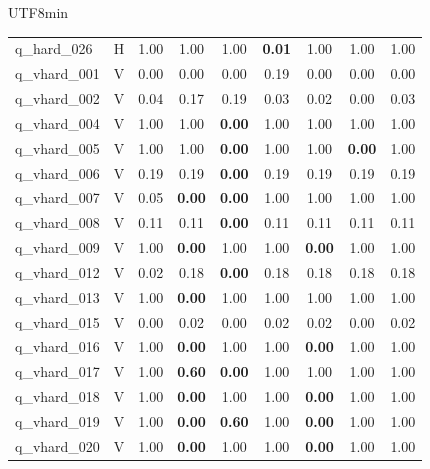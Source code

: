\documentclass[sn-mathphys,Numbered]{sn-jnl}
\begin{document}
\begin{CJK}{UTF8}{min}
\begin{table}[htbp]
\begin{tabular}{@{}llccccccc@{}}
    q\_hard\_026 & H & 1.00 & 1.00 & 1.00 & \textbf{0.01} & 1.00 & 1.00 & 1.00 \\
    q\_vhard\_001 & V & 0.00 & 0.00 & 0.00 & 0.19 & 0.00 & 0.00 & 0.00 \\
    q\_vhard\_002 & V & 0.04 & 0.17 & 0.19 & 0.03 & 0.02 & 0.00 & 0.03 \\
    q\_vhard\_004 & V & 1.00 & 1.00 & \textbf{0.00} & 1.00 & 1.00 & 1.00 & 1.00 \\
    q\_vhard\_005 & V & 1.00 & 1.00 & \textbf{0.00} & 1.00 & 1.00 & \textbf{0.00} & 1.00 \\
    q\_vhard\_006 & V & 0.19 & 0.19 & \textbf{0.00} & 0.19 & 0.19 & 0.19 & 0.19 \\
    q\_vhard\_007 & V & 0.05 & \textbf{0.00} & \textbf{0.00} & 1.00 & 1.00 & 1.00 & 1.00 \\
    q\_vhard\_008 & V & 0.11 & 0.11 & \textbf{0.00} & 0.11 & 0.11 & 0.11 & 0.11 \\
    q\_vhard\_009 & V & 1.00 & \textbf{0.00} & 1.00 & 1.00 & \textbf{0.00} & 1.00 & 1.00 \\
    q\_vhard\_012 & V & 0.02 & 0.18 & \textbf{0.00} & 0.18 & 0.18 & 0.18 & 0.18 \\
    q\_vhard\_013 & V & 1.00 & \textbf{0.00} & 1.00 & 1.00 & 1.00 & 1.00 & 1.00 \\
    q\_vhard\_015 & V & 0.00 & 0.02 & 0.00 & 0.02 & 0.02 & 0.00 & 0.02 \\
    q\_vhard\_016 & V & 1.00 & \textbf{0.00} & 1.00 & 1.00 & \textbf{0.00} & 1.00 & 1.00 \\
    q\_vhard\_017 & V & 1.00 & \textbf{0.60} & \textbf{0.00} & 1.00 & 1.00 & 1.00 & 1.00 \\
    q\_vhard\_018 & V & 1.00 & \textbf{0.00} & 1.00 & 1.00 & \textbf{0.00} & 1.00 & 1.00 \\
    q\_vhard\_019 & V & 1.00 & \textbf{0.00} & \textbf{0.60} & 1.00 & \textbf{0.00} & 1.00 & 1.00 \\
    q\_vhard\_020 & V & 1.00 & \textbf{0.00} & 1.00 & 1.00 & \textbf{0.00} & 1.00 & 1.00 \\
  \bottomrule
\end{tabular}
\end{table}


\end{CJK}
\end{document}
